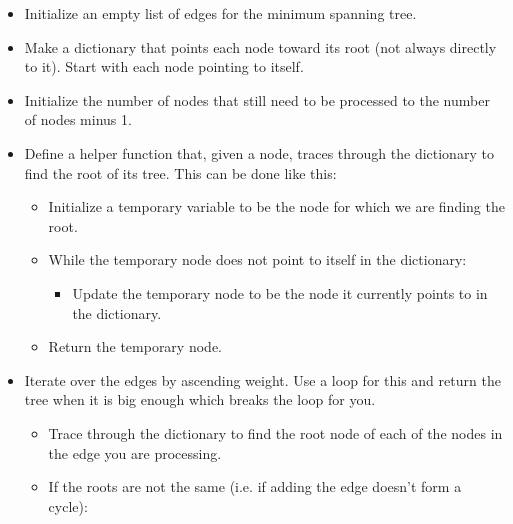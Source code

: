 \begin{itemize}


\item Initialize an empty list of edges for the minimum spanning tree.

\item Make a dictionary that points each node toward its root (not always directly to it).
Start with each node pointing to itself.

\item Initialize the number of nodes that still need to be processed to the number of nodes minus 1.

\item Define a helper function that, given a node, traces through the dictionary to find the root of its tree.
This can be done like this:

	\begin{itemize}

	\item Initialize a temporary variable to be the node for which we are finding the root.

	\item While the temporary node does not point to itself in the dictionary:

		\begin{itemize}

		\item Update the temporary node to be the node it currently points to in the dictionary.

		\end{itemize}

	\item Return the temporary node.

	\end{itemize}

\item Iterate over the edges by ascending weight.
Use a  loop for this and return the tree when it is big enough which breaks the loop for you.

	\begin{itemize}

	\item Trace through the dictionary to find the root node of each of the nodes in the edge you are processing.

	\item If the roots are not the same (i.e. if adding the edge doesn't form a cycle):


\end{itemize}
\end{itemize}
